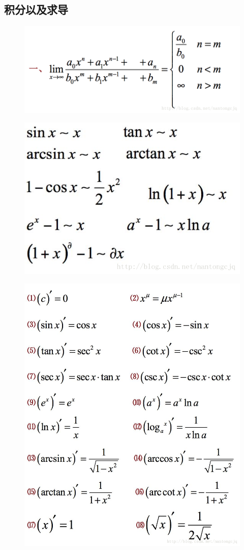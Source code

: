 \documentclass[a4paper,13.6pt]{article}
\begin{document}
\begin{CJK}{UTF8}{gbsn}
\subsection{积分以及求导}
  \begin{figure}[!htb]
      \begin{center}
        \includegraphics[width=0.50\linewidth]{../scoure/1.png}
      \end{center}
    \end{figure}
    \begin{figure}[!htb]
      \begin{center}
        \includegraphics[width=0.30\linewidth]{../scoure/3.png}
      \end{center}
    \end{figure}
    \begin{figure}[!htb]
      \begin{center}
        \includegraphics[width=0.50\linewidth]{../scoure/5.png}
      \end{center}
    \end{figure}
    \begin{figure}[!htb]
      \begin{center}

\end{center}
\end{figure}
\end{CJK}
\end{document}
